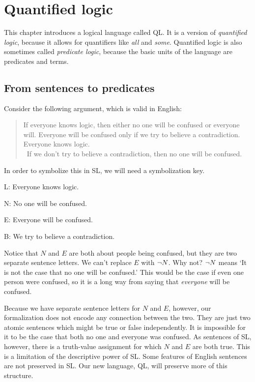 \chapter{Quantified logic}
\label{ch.QL}

This chapter introduces a logical language called QL. It is a version of \emph{quantified logic}, because it allows for quantifiers like \emph{all} and \emph{some}. Quantified logic is also sometimes called \emph{predicate logic}, because the basic units of the language are predicates and terms.

\section{From sentences to predicates}
Consider the following argument, which is valid in English:
\begin{quote}
If everyone knows logic, then either no one will be confused or everyone will. Everyone will be confused only if we try to believe a contradiction. Everyone knows logic.\\
\therefore\ If we don't try to believe a contradiction, then no one will be confused.
\end{quote}
In order to symbolize this in SL, we will need a symbolization key. 
\begin{ekey}
\item[L:] Everyone knows logic.
\item[N:] No one will be confused.
\item[E:] Everyone will be confused.
\item[B:] We try to believe a contradiction.
\end{ekey}
Notice that $N$ and $E$ are both about people being confused, but they are two separate sentence letters. We can't replace $E$ with $\neg N$. Why not? $\neg N$ means `It is not the case that no one will be confused.' This would be the case if even one person were confused, so it is a long way from saying that \emph{everyone} will be confused.

Because we have separate sentence letters for $N$ and $E$, however, our formalization does not encode any connection between the two. They are just two atomic sentences which might be true or false independently. It is impossible for it to be the case that both no one and everyone was confused. As sentences of SL, however, there is a truth-value assignment for which $N$ and $E$ are both true. This is a limitation of the descriptive power of SL. Some features of English sentences are not preserved in SL. Our new language, QL, will preserve more of this structure.

